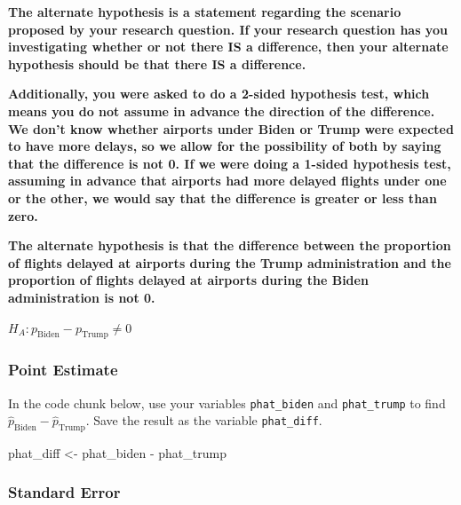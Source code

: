 \documentclass[
  letterpaper,
  DIV=11,
  numbers=noendperiod]{scrartcl}
\newenvironment{Shaded}{\begin{snugshade}}{\end{snugshade}}
\newcommand{\NormalTok}[1]{\textcolor[rgb]{0.00,0.23,0.31}{#1}}
\newcommand{\OtherTok}[1]{\textcolor[rgb]{0.00,0.23,0.31}{#1}}
\newcommand{\SpecialCharTok}[1]{\textcolor[rgb]{0.37,0.37,0.37}{#1}}
\begin{document}
\begin{tcolorbox}[enhanced jigsaw, toprule=.15mm, breakable, leftrule=.75mm, bottomrule=.15mm, rightrule=.15mm, colback=white, opacityback=0, colframe=quarto-callout-warning-color-frame, left=2mm, arc=.35mm]

\textbf{The alternate hypothesis is a statement regarding the scenario
proposed by your research question. If your research question has you
investigating whether or not there IS a difference, then your alternate
hypothesis should be that there IS a difference.}

\textbf{Additionally, you were asked to do a 2-sided hypothesis test,
which means you do not assume in advance the direction of the
difference. We don't know whether airports under Biden or Trump were
expected to have more delays, so we allow for the possibility of both by
saying that the difference is not 0. If we were doing a 1-sided
hypothesis test, assuming in advance that airports had more delayed
flights under one or the other, we would say that the difference is
greater or less than zero.}

\textbf{The alternate hypothesis is that the difference between the
proportion of flights delayed at airports during the Trump
administration and the proportion of flights delayed at airports during
the Biden administration is not 0.}

\(H_A \colon p_{\text{Biden}}-p_{\text{Trump}} \ne 0\)

\end{tcolorbox}

\subsubsection{Point Estimate}\label{point-estimate}

In the code chunk below, use your variables \texttt{phat\_biden} and
\texttt{phat\_trump} to find
\(\hat{p}_{\text{Biden}}-\hat{p}_{\text{Trump}}\). Save the result as
the variable \texttt{phat\_diff}.

\begin{Shaded}
\begin{Highlighting}[]
\NormalTok{phat\_diff }\OtherTok{\textless{}{-}}\NormalTok{ phat\_biden }\SpecialCharTok{{-}}\NormalTok{ phat\_trump}
\end{Highlighting}
\end{Shaded}

\subsubsection{Standard Error}\label{standard-error}
\end{document}
